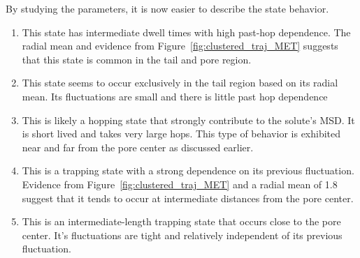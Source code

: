 \documentclass[journal=jpcbfk,manuscript=article]{achemso}
\begin{document}
  By studying the parameters, it is now easier to describe the state behavior.
  \begin{enumerate}[label={State \theenumi :}, leftmargin=3.5\parindent]
     \item This state has intermediate dwell times with high past-hop dependence.
     The radial mean and evidence from Figure~\ref{fig:clustered_traj_MET} suggests
     that this state is common in the tail and pore region.
     \item This state seems to occur exclusively in the tail region based on its radial
     mean. Its fluctuations are small and there is little past hop dependence
     \item This is likely a hopping state that strongly contribute to the solute's MSD. 
     It is short lived and takes very large hops. This type of behavior is exhibited 
     near and far from the pore center as discussed earlier.
     \item This is a trapping state with a strong dependence on its previous fluctuation.
     Evidence from Figure~\ref{fig:clustered_traj_MET} and a radial mean of 1.8 suggest
     that it tends to occur at intermediate distances from the pore center.
     \item This is an intermediate-length trapping state that occurs close to the pore
     center. It's fluctuations are tight and relatively independent of its previous 
     fluctuation.
  \end{enumerate}
  
\end{document}
